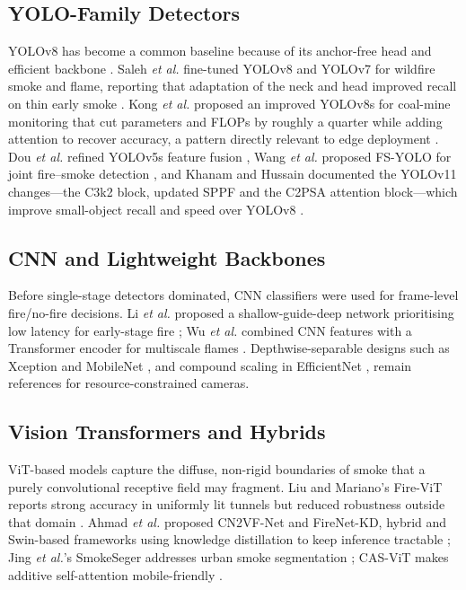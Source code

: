 \documentclass[conference]{IEEEtran}
\begin{document}
\subsection{YOLO-Family Detectors}
YOLOv8 has become a common baseline because of its anchor-free head and efficient backbone \cite{jocher2023yolov8}. Saleh \textit{et al.} fine-tuned YOLOv8 and YOLOv7 for wildfire smoke and flame, reporting that adaptation of the neck and head improved recall on thin early smoke \cite{saleh2024}. Kong \textit{et al.} proposed an improved YOLOv8s for coal-mine monitoring that cut parameters and FLOPs by roughly a quarter while adding attention to recover accuracy, a pattern directly relevant to edge deployment \cite{kong2024}. Dou \textit{et al.} refined YOLOv5s feature fusion \cite{dou2024}, Wang \textit{et al.} proposed FS-YOLO for joint fire--smoke detection \cite{wang2024fsyolo}, and Khanam and Hussain documented the YOLOv11 changes---the C3k2 block, updated SPPF and the C2PSA attention block---which improve small-object recall and speed over YOLOv8 \cite{khanam2024yolov11}.

\subsection{CNN and Lightweight Backbones}
Before single-stage detectors dominated, CNN classifiers were used for frame-level fire/no-fire decisions. Li \textit{et al.} proposed a shallow-guide-deep network prioritising low latency for early-stage fire \cite{li2024shallow}; Wu \textit{et al.} combined CNN features with a Transformer encoder for multiscale flames \cite{wu2024}. Depthwise-separable designs such as Xception \cite{chollet2017} and MobileNet \cite{howard2017mobilenet}, and compound scaling in EfficientNet \cite{tan2019efficientnet}, remain references for resource-constrained cameras.

\subsection{Vision Transformers and Hybrids}
ViT-based models \cite{dosovitskiy2021vit} capture the diffuse, non-rigid boundaries of smoke that a purely convolutional receptive field may fragment. Liu and Mariano's Fire-ViT reports strong accuracy in uniformly lit tunnels but reduced robustness outside that domain \cite{liu2025firevit}. Ahmad \textit{et al.} proposed CN2VF-Net and FireNet-KD, hybrid and Swin-based frameworks using knowledge distillation to keep inference tractable \cite{ahmad2025cn2vf,ahmad2025firenet}; Jing \textit{et al.}'s SmokeSeger addresses urban smoke segmentation \cite{jing2023smokeseger}; CAS-ViT makes additive self-attention mobile-friendly \cite{zhang2024casvit}.
\end{document}
